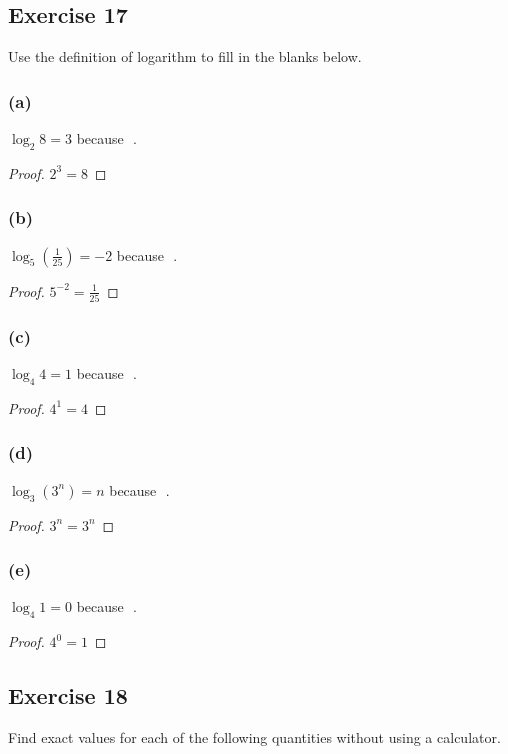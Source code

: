 \documentclass[14pt]{extarticle}
\newcommand{\dps}{\displaystyle}
\newcommand{\fbl}{\underline{\hspace{1cm}}\,\,}
\begin{document}
\subsection{Exercise 17}
Use the definition of logarithm to fill in the blanks below.

\subsubsection{(a)}
\(\log_{2} 8 = 3\) because \fbl.

\begin{proof}
    \(2^3 = 8\)
\end{proof}

\subsubsection{(b)}
\(\log_{5}(\frac{1}{25}) = -2\) because \fbl.

\begin{proof}
    \(\dps 5^{-2} = \frac{1}{25}\)
\end{proof}

\subsubsection{(c)}
\(\log_{4} 4 = 1\) because \fbl.

\begin{proof}
    \(4^1 = 4\)
\end{proof}

\subsubsection{(d)}
\(\log_{3}(3^n) = n\) because \fbl.

\begin{proof}
    \(3^n = 3^n\)
\end{proof}

\subsubsection{(e)}
\(\log_{4} 1 = 0\) because \fbl.

\begin{proof}
    \(4^0 = 1\)
\end{proof}

\subsection{Exercise 18}
Find exact values for each of the following quantities without using a calculator.
\end{document}
